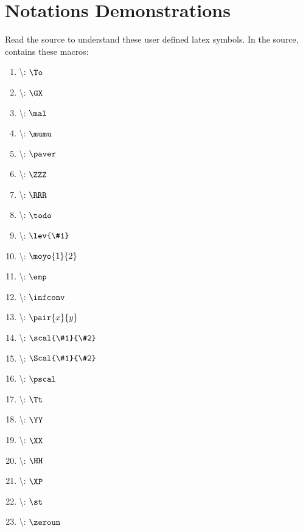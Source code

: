 \section{Notations Demonstrations}
    Read the source to understand these user defined latex symbols. 
    In the source,  contains these macros: 
    \begin{enumerate}
        \item \textbackslash{}: $\To$
        \item \textbackslash{}: $\GX$ 
        \item \textbackslash{}: $\mal$
        \item \textbackslash{}: $\mumu$
        \item \textbackslash{}: $\paver$
        \item \textbackslash{}: $\ZZZ$
        \item \textbackslash{}: $\RRR$
        \item \textbackslash{}: $\todo$
        \item \textbackslash{}: $\lev{\#1}$
        \item \textbackslash{}: $\moyo{1}{2}$
        \item \textbackslash{}: $\emp$
        \item \textbackslash{}: $\infconv$
        \item \textbackslash{}: $\pair{x}{y}$
        \item \textbackslash{}: $\scal{\#1}{\#2}$
        \item \textbackslash{}: $\Scal{\#1}{\#2}$
        \item \textbackslash{}: $\pscal$
        \item \textbackslash{}: $\Tt$
        \item \textbackslash{}: $\YY$
        \item \textbackslash{}: $\XX$
        \item \textbackslash{}: $\HH$
        \item \textbackslash{}: $\XP$
        \item \textbackslash{}: $\st$
        \item \textbackslash{}: $\zeroun$
    \end{enumerate}

